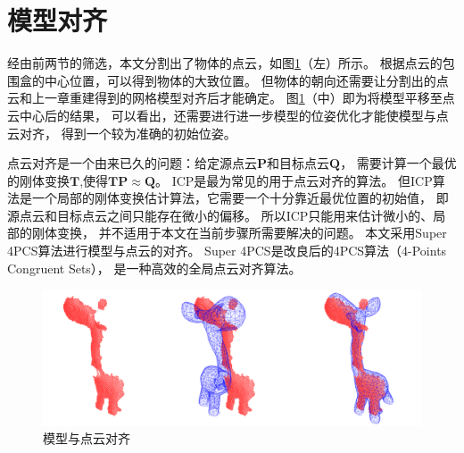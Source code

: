 \section{模型对齐}

经由前两节的筛选，本文分割出了物体的点云，如图\ref{rigid_fit}（左）所示。
根据点云的包围盒的中心位置，可以得到物体的大致位置。
但物体的朝向还需要让分割出的点云和上一章重建得到的网格模型对齐后才能确定。
图\ref{rigid_fit}（中）即为将模型平移至点云中心后的结果，
可以看出，还需要进行进一步模型的位姿优化才能使模型与点云对齐，
得到一个较为准确的初始位姿。

点云对齐是一个由来已久的问题：给定源点云$\bm{P}$和目标点云$\bm{Q}$，
需要计算一个最优的刚体变换$\bm{T}$,使得$\bm{TP} \approx \bm{Q}$。
ICP是最为常见的用于点云对齐的算法。
但ICP算法是一个局部的刚体变换估计算法，它需要一个十分靠近最优位置的初始值，
即源点云和目标点云之间只能存在微小的偏移。
所以ICP只能用来估计微小的、局部的刚体变换，
并不适用于本文在当前步骤所需要解决的问题。
本文采用Super 4PCS算法\cite{mellado2014super}进行模型与点云的对齐。
Super 4PCS是改良后的4PCS算法（4-Points Congruent Sets）\cite{aiger20084}，
是一种高效的全局点云对齐算法。
\begin{figure}
    \centering
    \includegraphics[width = \textwidth]{./Pictures/rigidfitting.png}
    \caption{模型与点云对齐}
    \label{rigid_fit}
\end{figure}
